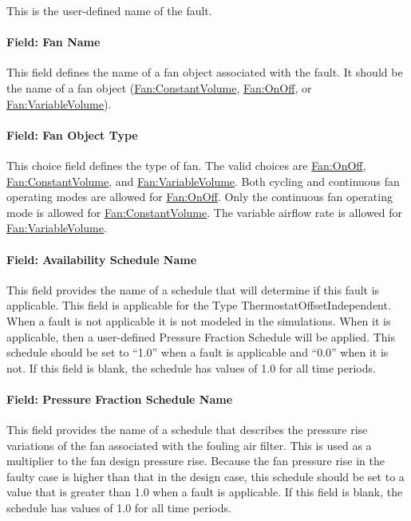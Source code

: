 This is the user-defined name of the fault.

\paragraph{Field: Fan Name}\label{field-fan-name-002}

This field defines the name of a fan object associated with the fault. It should be the name of a fan object (\hyperref[fanconstantvolume]{Fan:ConstantVolume}, \hyperref[fanonoff]{Fan:OnOff}, or \hyperref[fanvariablevolume]{Fan:VariableVolume}).

\paragraph{Field: Fan Object Type}\label{field-fan-object-type-000}

This choice field defines the type of fan. The valid choices are \hyperref[fanonoff]{Fan:OnOff}, \hyperref[fanconstantvolume]{Fan:ConstantVolume}, and \hyperref[fanvariablevolume]{Fan:VariableVolume}. Both cycling and continuous fan operating modes are allowed for \hyperref[fanonoff]{Fan:OnOff}. Only the continuous fan operating mode is allowed for \hyperref[fanconstantvolume]{Fan:ConstantVolume}. The variable airflow rate is allowed for \hyperref[fanvariablevolume]{Fan:VariableVolume}.

\paragraph{Field: Availability Schedule Name}\label{field-availability-schedule-name-8-002}

This field provides the name of a schedule that will determine if this fault is applicable. This field is applicable for the Type ThermostatOffsetIndependent. When a fault is not applicable it is not modeled in the simulations. When it is applicable, then a user-defined Pressure Fraction Schedule will be applied. This schedule should be set to ``1.0'' when a fault is applicable and ``0.0'' when it is not. If this field is blank, the schedule has values of 1.0 for all time periods.

\paragraph{Field: Pressure Fraction Schedule Name}\label{field-pressure-fraction-schedule-name}

This field provides the name of a schedule that describes the pressure rise variations of the fan associated with the fouling air filter. This is used as a multiplier to the fan design pressure rise. Because the fan pressure rise in the faulty case is higher than that in the design case, this schedule should be set to a value that is greater than 1.0 when a fault is applicable. If this field is blank, the schedule has values of 1.0 for all time periods.

